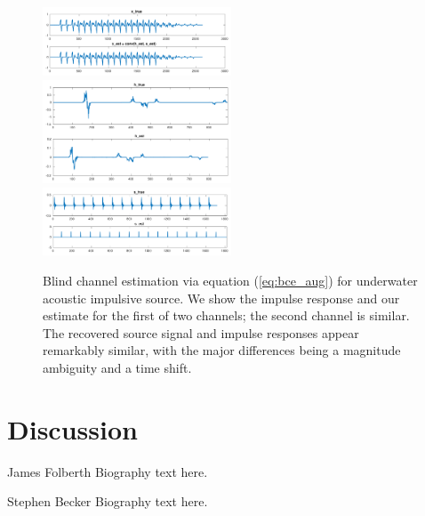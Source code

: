 \documentclass[journal]{IEEEtran}
\begin{document}
\begin{figure}
   \centering
   \includegraphics[width=0.5\textwidth]{figures/bce_rec_003_x_trim.pdf}
   \includegraphics[width=0.5\textwidth]{figures/bce_rec_003_h_trim.pdf}
   \includegraphics[width=0.5\textwidth]{figures/bce_rec_003_s_trim.pdf}
   \caption{Blind channel estimation via equation (\ref{eq:bce_aug}) for underwater acoustic impulsive source.  We show the impulse response and our estimate for the first of two channels; the second channel is similar.  The recovered source signal and impulse responses appear remarkably similar, with the major differences being a magnitude ambiguity and a time shift.}
   \label{fig:bce_rec}
\end{figure}



\section{Discussion}







\begin{IEEEbiographynophoto}{James Folberth}
Biography text here.
\end{IEEEbiographynophoto}

\begin{IEEEbiographynophoto}{Stephen Becker}
Biography text here.
\end{IEEEbiographynophoto}
\end{document}
